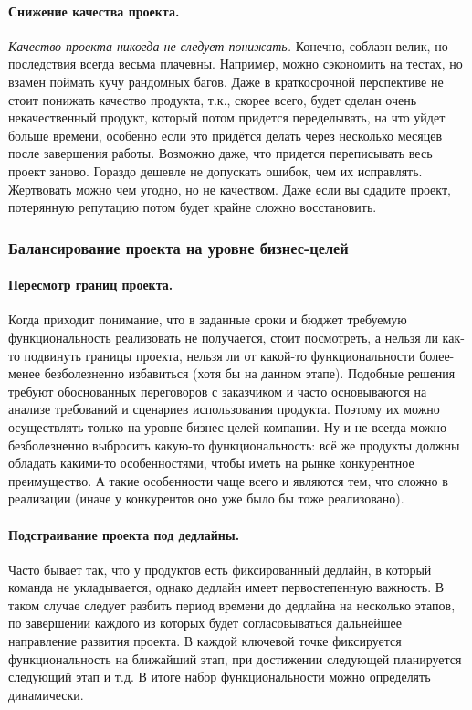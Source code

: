 \documentclass{../../text-style}
\begin{document}
\paragraph{Снижение качества проекта.} \emph{Качество проекта никогда не следует понижать.} Конечно, соблазн велик, но последствия всегда весьма плачевны. Например, можно сэкономить на тестах, но взамен поймать кучу рандомных багов. Даже в краткосрочной перспективе не стоит понижать качество продукта, т.к., скорее всего, будет сделан очень некачественный продукт, который потом придется переделывать, на что уйдет больше времени, особенно если это придётся делать через несколько месяцев после завершения работы. Возможно даже, что придется переписывать весь проект заново. Гораздо дешевле не допускать ошибок, чем их исправлять. Жертвовать можно чем угодно, но не качеством. Даже если вы сдадите проект, потерянную репутацию потом будет крайне сложно восстановить.

\subsubsection{Балансирование проекта на уровне бизнес-целей}

\paragraph{Пересмотр границ проекта.} Когда приходит понимание, что в заданные сроки и бюджет требуемую функциональность реализовать не получается, стоит посмотреть, а нельзя ли как-то подвинуть границы проекта, нельзя ли от какой-то функциональности более-менее безболезненно избавиться (хотя бы на данном этапе). Подобные решения требуют обоснованных переговоров с заказчиком и часто основываются на анализе требований и сценариев использования продукта. Поэтому их можно осуществлять только на уровне бизнес-целей компании. Ну и не всегда можно безболезненно выбросить какую-то функциональность: всё же продукты должны обладать какими-то особенностями, чтобы иметь на рынке конкурентное преимущество. А такие особенности чаще всего и являются тем, что сложно в реализации (иначе у конкурентов оно уже было бы тоже реализовано).

\paragraph{Подстраивание проекта под дедлайны.} Часто бывает так, что у продуктов есть фиксированный дедлайн, в который команда не укладывается, однако дедлайн имеет первостепенную важность. В таком случае следует разбить период времени до дедлайна на несколько этапов, по завершении каждого из которых будет согласовываться дальнейшее направление развития проекта. В каждой ключевой точке фиксируется функциональность на ближайший этап, при достижении следующей планируется следующий этап и т.д. В итоге набор функциональности можно определять динамически.
\end{document}
